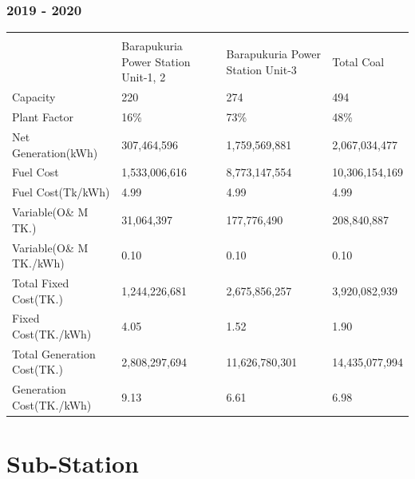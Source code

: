 \documentclass[11 pt]{article}
\begin{document}
\subsubsection{2019 - 2020}
	\begin{longtable}{|| m{5.1 em} || m{8 em} || m{7.5 em} || m{5.5 em} ||}
		\hline\hline
		\rowcolor{teal!20}
		\multicolumn{4}{c}{\textbf{\textsf{\textcolor{black}{Generating Plant Under Power Station}}}}\\
		\rowcolor{blue!60}
		\hline\hline
		    \hline
			 & {\footnotesize Barapukuria Power Station Unit-1, 2} & {\footnotesize Barapukuria Power Station Unit-3} & {\footnotesize Total Coal}\\
			\hline
			\footnotesize{Capacity} & 220 & 274 & 494\\
			\footnotesize{Plant Factor} & 16\% & 73\% & 48\%\\
			\footnotesize{Net Generation(kWh)} & 307,464,596 & 1,759,569,881 & {\small 2,067,034,477}\\
			\footnotesize{Fuel Cost} & 1,533,006,616 & 8,773,147,554 & {\small 10,306,154,169}\\
			\footnotesize{Fuel Cost(Tk/kWh)} & 4.99 & 4.99 & 4.99\\
			\footnotesize{Variable(O\& M TK.)} & 31,064,397 & 177,776,490 & {\small 208,840,887}\\
			\footnotesize{Variable(O\& M TK./kWh)} & 0.10 & 0.10 & 0.10\\
			\footnotesize{Total Fixed Cost(TK.)} & 1,244,226,681 & 2,675,856,257 & {\small 3,920,082,939}\\
			\tiny{Fixed Cost(TK./kWh)} & 4.05 & 1.52 & 1.90\\
			\footnotesize{Total Generation Cost(TK.)} & 2,808,297,694 & 11,626,780,301 & {\small 14,435,077,994}\\
			\tiny{Generation Cost(TK./kWh)} & 9.13 & 6.61 & 6.98\\
		\hline\hline
	\end{longtable}
\pagebreak

\section{Sub-Station}
\hspace{5 mm} \vspace{4 mm}\\
\end{document}
